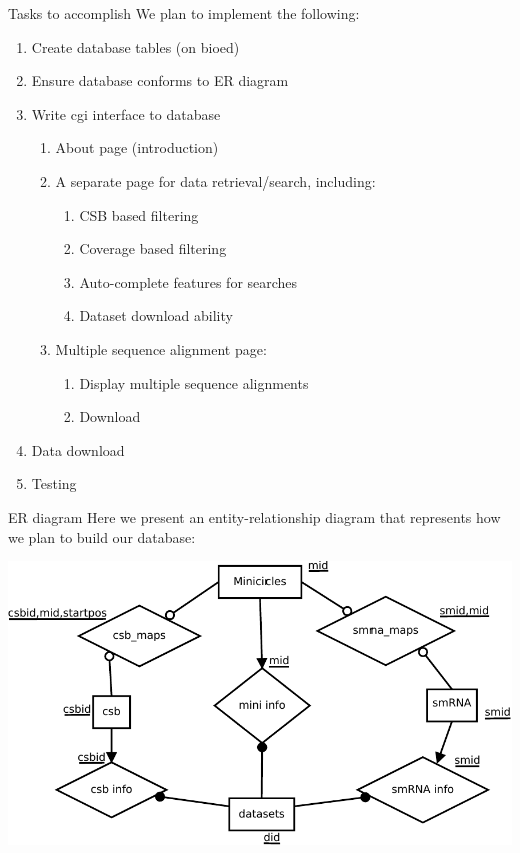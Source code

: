 \documentclass[a4paper,10pt,notitlepage]{article}
\begin{document}
\begin{section}{Tasks to accomplish}
    We plan to implement the following:

    \begin{enumerate}
        \item Create database tables (on bioed)
        \item Ensure database conforms to ER diagram
        \item Write cgi interface to database
        \begin{enumerate}
            \item About page (introduction)
            \item A separate page for data retrieval/search, including:
                \begin{enumerate}
                    \item CSB based filtering
                    \item Coverage based filtering
                    \item Auto-complete features for searches
                    \item Dataset download ability
                \end{enumerate}
            \item Multiple sequence alignment page:
                \begin{enumerate}
                    \item Display multiple sequence alignments
                    \item Download
                \end{enumerate}
        \end{enumerate}
        \item Data download
        \item Testing
    \end{enumerate}

\end{section}



\begin{section}{ER diagram}
    Here we present an entity-relationship diagram that represents how we plan to build our database:

    \includegraphics[width=.8\textwidth]{ERdiagram-crop.pdf}
    
\end{section}
\end{document}
